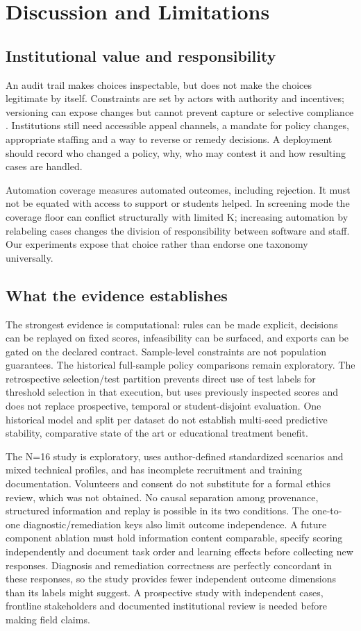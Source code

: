 \section{Discussion and Limitations}
\label{sec:discussion}
\subsection{Institutional value and responsibility}
An audit trail makes choices inspectable, but does not make the choices legitimate by itself. Constraints are set by actors with authority and incentives; versioning can expose changes but cannot prevent capture or selective compliance \cite{Selbst2019Abstraction,Metcalf2021AIA}. Institutions still need accessible appeal channels, a mandate for policy changes, appropriate staffing and a way to reverse or remedy decisions. A deployment should record who changed a policy, why, who may contest it and how resulting cases are handled.

Automation coverage measures automated outcomes, including rejection. It must not be equated with access to support or students helped. In screening mode the coverage floor can conflict structurally with limited K; increasing automation by relabeling cases changes the division of responsibility between software and staff. Our experiments expose that choice rather than endorse one taxonomy universally.

\subsection{What the evidence establishes}
The strongest evidence is computational: rules can be made explicit, decisions can be replayed on fixed scores, infeasibility can be surfaced, and exports can be gated on the declared contract. Sample-level constraints are not population guarantees. The historical full-sample policy comparisons remain exploratory. The retrospective selection/test partition prevents direct use of test labels for threshold selection in that execution, but uses previously inspected scores and does not replace prospective, temporal or student-disjoint evaluation. One historical model and split per dataset do not establish multi-seed predictive stability, comparative state of the art or educational treatment benefit.

The N=16 study is exploratory, uses author-defined standardized scenarios and mixed technical profiles, and has incomplete recruitment and training documentation. Volunteers and consent do not substitute for a formal ethics review, which was not obtained. No causal separation among provenance, structured information and replay is possible in its two conditions. The one-to-one diagnostic/remediation keys also limit outcome independence. A future component ablation must hold information content comparable, specify scoring independently and document task order and learning effects before collecting new responses. Diagnosis and remediation correctness are perfectly concordant in these responses, so the study provides fewer independent outcome dimensions than its labels might suggest. A prospective study with independent cases, frontline stakeholders and documented institutional review is needed before making field claims.

